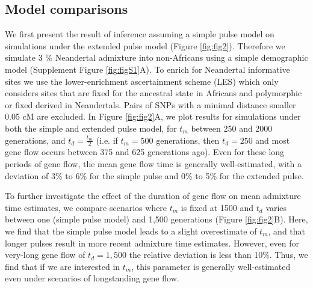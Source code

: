 \documentclass[11pt]{article}
\begin{document}
\subsection{Model comparisons}\label{Model comparison}
We first present the result of inference assuming a simple pulse model on simulations under the extended pulse model (Figure \ref{fig:fig2}). Therefore we simulate 3 \% Neandertal admixture into non-Africans using a simple demographic model (Supplement Figure \ref{fig:figS1}A). To enrich for Neandertal informative sites we use the lower-enrichment ascertainment scheme (LES)  which only considers sites that are fixed for the ancestral state in Africans and polymorphic or fixed derived in Neandertals. Pairs of SNPs with a minimal distance smaller 0.05 cM are excluded.
In Figure \ref{fig:fig2}A, we plot results for simulations under both the simple and extended pulse model, for $t_m$ between 250 and 2000 generations, and $t_d = \frac{t_m}{2}$  (i.e. if $t_m= 500$ generations, then $t_d = 250$ and most gene flow occurs between  375 and 625
generations ago). Even for these long periods of gene flow, the mean gene flow time is generally well-estimated, with a deviation of 3\% to 6\% for the simple pulse and 0\% to 5\% for
the extended pulse.

To further investigate the effect of the duration of gene flow on mean
admixture time estimates, we compare scenarios where $t_m$ is fixed at 1500 and $t_d$ varies between one (simple pulse model) and 1,500 generations (Figure \ref{fig:fig2}B). Here, we find that the simple pulse model leads to a slight overestimate of $t_m$, and that longer pulses result in more recent admixture time estimates. However, even  for very-long gene flow of $t_d=1,500$ the relative deviation is less than 10\%. Thus, we find that if we are interested in $t_m$, this parameter is generally well-estimated even under scenarios of longstanding gene flow.
\end{document}

